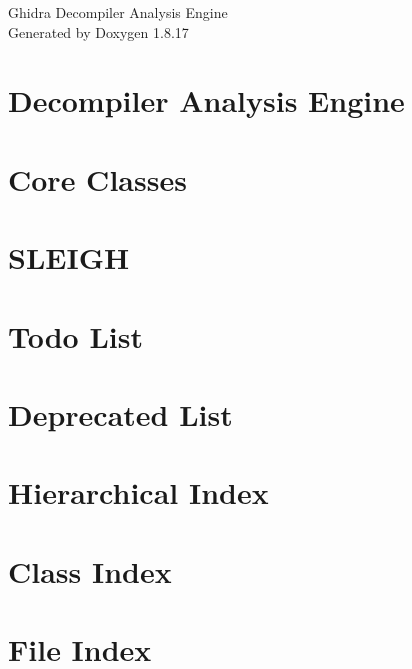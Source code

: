 \let\mypdfximage\pdfximage\def\pdfximage{\immediate\mypdfximage}\documentclass[twoside]{book}
\newcommand{\+}{\discretionary{\mbox{\scriptsize$\hookleftarrow$}}{}{}}
\newcommand{\clearemptydoublepage}{%
  \newpage{\pagestyle{empty}\cleardoublepage}%
}
\begin{document}
\hypersetup{pageanchor=false,
             bookmarksnumbered=true,
             pdfencoding=unicode
            }
\begin{titlepage}
\vspace*{7cm}
\begin{center}%
{\Large Ghidra Decompiler Analysis Engine }\\
\vspace*{1cm}
{\large Generated by Doxygen 1.8.17}\\
\end{center}
\end{titlepage}
\clearemptydoublepage
{}
\tableofcontents
\clearemptydoublepage
{}
\hypersetup{pageanchor=true}

\chapter{Decompiler Analysis Engine}
\label{index}\hypertarget{index}{}
\chapter{Core Classes}
\label{coreclasses}

\chapter{S\+L\+E\+I\+GH}
\label{sleigh}

\chapter{Todo List}
\label{todo}

\chapter{Deprecated List}
\label{deprecated}

\chapter{Hierarchical Index}

\chapter{Class Index}

\chapter{File Index}

\end{document}
